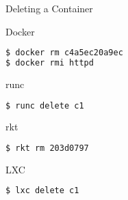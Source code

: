 \begin{frame}[fragile]{Deleting a Container}

\begin{block}{Docker}
\begin{lstlisting}[language=bash,keywordstyle=\bf,stringstyle=\it,basicstyle=\tiny]
$ docker rm c4a5ec20a9ec 
$ docker rmi httpd
\end{lstlisting}
\end{block}

\begin{block}{runc}
\begin{lstlisting}[language=bash,keywordstyle=\bf,stringstyle=\it,basicstyle=\tiny]
$ runc delete c1
\end{lstlisting}
\end{block}



\begin{block}{rkt}
\begin{lstlisting}[language=bash,keywordstyle=\bf,stringstyle=\it,basicstyle=\tiny]
$ rkt rm 203d0797
\end{lstlisting}
\end{block}

\begin{block}{LXC}
\begin{lstlisting}[language=bash,keywordstyle=\bf,stringstyle=\it,basicstyle=\tiny]
$ lxc delete c1
\end{lstlisting}
\end{block}

\end{frame}